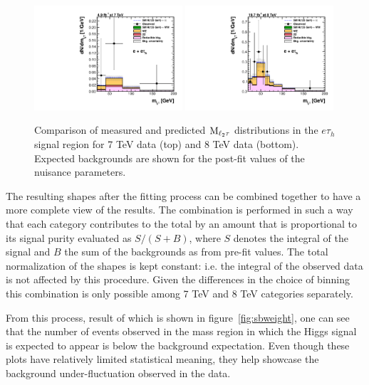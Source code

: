 \begin{figure}
\begin{center}
  \includegraphics[width=0.49\textwidth]{4_Analisys/pics/postfit/eet_postfit_7TeV_FitAllChannels.pdf}
  \includegraphics[width=0.49\textwidth]{4_Analisys/pics/postfit/eet_postfit_8TeV_FitAllChannels.pdf}\\
  \caption{Comparison of measured and predicted $\rm{M}_{\ell_2\tau}$ distributions in the $e\tau_h$ signal region for 7 TeV data (top) and 8 TeV data (bottom). 
    Expected backgrounds are shown for the post-fit values of the nuisance parameters. }
  \label{fig:LLT_eet_postfit}
\end{center}
\end{figure}

The resulting shapes after the fitting process can be combined together to have a more complete view of the results. The combination is performed in such a way that each category contributes to the total by an amount that is proportional to its signal purity evaluated as $S / (S+B)$, where $S$ denotes the integral of the signal and $B$ the sum of the backgrounds as from pre-fit values. The total normalization of the shapes is kept constant: i.e. the integral of the observed data is not affected by this procedure. Given the differences in the choice of binning this combination is only possible among 7 TeV and 8 TeV categories separately. 

From this process, result of which is shown in figure~\ref{fig:sbweight}, one can see that the number of events observed in the mass region in which the Higgs signal is expected to appear is below the background expectation. %
Even though these plots have relatively limited statistical meaning, they help showcase the background under-fluctuation observed in the data.

